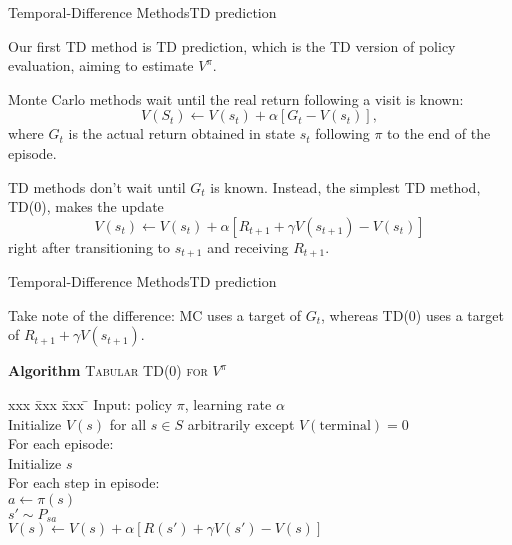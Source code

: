 \documentclass{beamer}
\begin{document}
\begin{frame}{Temporal-Difference Methods}{TD prediction}

  Our first TD method is \alert{TD prediction}, which is the TD
  version of policy evaluation, aiming to estimate $V^\pi$.

  \medskip

  Monte Carlo methods wait until the real return following a visit
  is known:
  $$V(S_t) \leftarrow V(s_t) + \alpha \left[ G_t - V(s_t) \right],$$
  where $G_t$ is the \alert{actual return} obtained in state $s_t$
  following $\pi$ to the end of the episode.

  \medskip

  TD methods don't wait until $G_t$ is known. Instead, the simplest
  TD method, TD(0), makes the update
  $$ V(s_t) \leftarrow V(s_t) + \alpha \left[ R_{t+1} + \gamma V(s_{t+1})
    - V(s_t) \right] $$
  right after transitioning to $s_{t+1}$ and receiving $R_{t+1}$.

\end{frame}


\begin{frame}{Temporal-Difference Methods}{TD prediction}

  Take note of the difference: MC uses a target of $G_t$, whereas
  TD(0) uses a target of $R_{t+1} + \gamma V(s_{t+1})$.

  \medskip
  
  \begin{block}{\textbf{Algorithm} \textsc{Tabular TD(0) for $V^\pi$}}

  \begin{tabbing}
    xxx \= xxx \= xxx \= \kill
    \> Input: policy $\pi$, learning rate $\alpha$ \\
    \> Initialize $V(s)$ for all $s \in S$ arbitrarily except $V(\mathrm{terminal}) = 0$\\
    \> For each episode: \\
    \> \> Initialize $s$ \\
    \> \> For each step in episode: \\
    \> \> \> $a \leftarrow \pi(s)$ \\
    \> \> \> $s' \sim P_{sa}$ \\
    \> \> \> $V(s) \leftarrow V(s) + \alpha \left[ R(s') + \gamma V(s') - V(s)\right]$ \\
  \end{tabbing}

  \end{block}

\end{frame}
\end{document}
